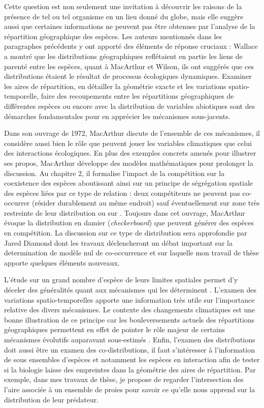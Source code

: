Cette question est non seulement une invitation à découvrir les raisons
de la présence de tel ou tel organisme en un lieu donné du globe, mais
elle suggère aussi que certaines informations ne peuvent pas être
obtenues par l'analyse de la répartition géographique des espèces. Les
auteurs mentionnés dans les paragraphes précédents y ont apporté des
éléments de réponse cruciaux : Wallace a montré que les distributions
géographiques reflétaient en partie les liens de parenté entre les
espèces, quant à MacArthur et Wilson, ils ont suggérés que ces
distributions étaient le résultat de processus écologiques dynamiques.
Examiner les aires de répartition, en détailler la géométrie exacte et
les variations spatio-temporelle, faire des recoupements entre les
répartitions géographiques de différentes espèces ou encore avec la
distribution de variables abiotiques sont des démarches fondamentales
pour en apprécier les mécanismes sous-jacents.

Dans son ouvrage de 1972, MacArthur discute de l'ensemble de ces
mécanismes, il considère aussi bien le rôle que peuvent jouer les
variables climatiques que celui des interactions écologiques. En plus
des exemples concrets amenés pour illustrer ses propos, MacArthur
développe des modèles mathématiques pour prolonger la discussion. Au
chapitre 2, il formalise l'impact de la compétition sur la coexistence
des espèces aboutissant ainsi sur un principe de ségrégation spatiale
des espèces liées par ce type de relation : deux compétiteurs ne peuvent
pas co-occurrer (résider durablement au même endroit) sauf
éventuellement sur zone très restreinte de leur distribution
\citep{macarthur1972geographical} ou sur . Toujours dans cet ouvrage,
MacArthur évoque la distribution en damier (\emph{checkerboard}) que
peuvent générer des espèces en compétition. La discussion sur ce type de
distribution sera approfondie par Jared Diamond \citep{Diamond1975} dont
les travaux déclencheront un débat important sur la determination de
modèle nul de co-occurrence \citep{Connor1979} et sur laquelle mon
travail de thèse apporte quelques éléments nouveaux.

L'étude sur un grand nombre d'espèce de leurs limites spatiales permet
d'y déceler des généralités quant aux mécanismes qui les déterminent
\citep{macarthur1972geographical}. L'examen des variations
spatio-temporelles apporte une information très utile sur l'importance
relative des divers mécanismes. Le contexte des changements climatiques
est une bonne illustration de ce principe car les bouleversements
actuels des répartitions géographiques permettent en effet de pointer le
rôle majeur de certains mécanismes évolutifs auparavant sous-estimés
\citep{Lavergne2010}. Enfin, l'examen des distributions doit aussi être
un examen des co-distributions, il faut s'intéresser à l'information de
sous ensembles d'espèces et notamment les espèces en interaction afin de
tester si la biologie laisse des empreintes dans la géométrie des aires
de répartition. Par exemple, dans mes travaux de thèse, je propose de
regarder l'intersection des l'aire associée à un ensemble de proies pour
savoir ce qu'elle nous apprend sur la distribution de leur prédateur.

